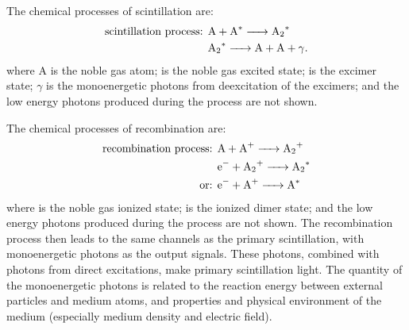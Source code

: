 The chemical processes of scintillation are:  
\begin{align}
\text{scintillation process: } & \ce{A + A^*  -> A_2^*}  \label{eqn:xenon sci 1}\\
& \ce{A_2^* ->A + A + \gamma }. \label{eqn:xenon sci 2}
\end{align}
where A is the noble gas atom;  is the noble gas excited state;  is the excimer state; $\gamma$ is the monoenergetic photons from deexcitation of the excimers; and the low energy photons produced during the process are not shown.

The chemical processes of recombination are:
\begin{align}
\text{recombination process: } & \ce{A + A^{+}  -> A_2^{+} } \\
& \ce{e^{-} + A_2^{+} ->A_2^* }\\%
\text{or: } & \ce{e^{-} + A^{+}  -> A^{*} } %
\end{align}
where   is the noble gas ionized state;  is the ionized dimer state; and the low energy photons produced during the process are not shown.%
The recombination process then leads to the same channels as the primary scintillation, with monoenergetic photons as the output signals. These photons, combined with photons from direct excitations, make primary scintillation light. 
The quantity of the monoenergetic photons is related to the reaction energy between external particles and medium atoms, and properties and physical environment of the medium (especially medium density and electric field). 

